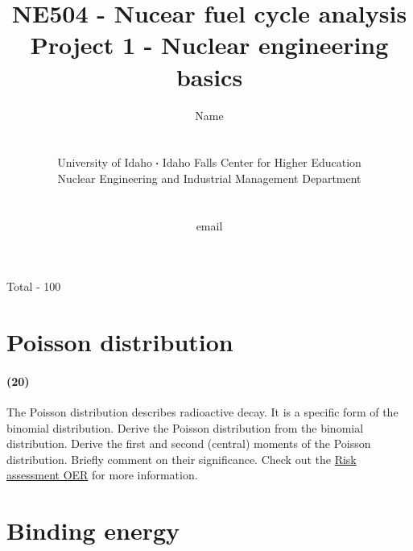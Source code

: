 \documentclass[11pt,a4paper]{article}
\newcommand*\sq{\mathbin{\vcenter{\hbox{\rule{.3ex}{.3ex}}}}} %
\begin{document}
\begin{titlepage}
    \title{
        NE504 - Nucear fuel cycle analysis\\
        Project 1 - Nuclear engineering basics\\
    }
    \author{
        Name
        \\ \\ \\
        University of Idaho $\sq$ Idaho Falls Center for Higher Education\\
        Nuclear Engineering and Industrial Management Department
        \\ \\ \\
        email 
    }
\clearpage %
\maketitle
\vspace*{\fill}
\begin{flushright}{
        Total - 100
}
\end{flushright}
\thispagestyle{empty} %
\end{titlepage}

\printnoidxglossary

\newpage

\section{Poisson distribution}
\paragraph*{(20)} 
The Poisson distribution describes radioactive decay. It is a specific form of the binomial distribution. Derive the Poisson distribution from the binomial distribution. Derive the first and second (central) moments of the Poisson distribution. Briefly comment on their significance. Check out the \href{https://courses.lumenlearning.com/uidaho-riskassessment/chapter/common-statistical-distributions/}{Risk assessment OER} for more information.





\newpage

\section{Binding energy}
\end{document}
